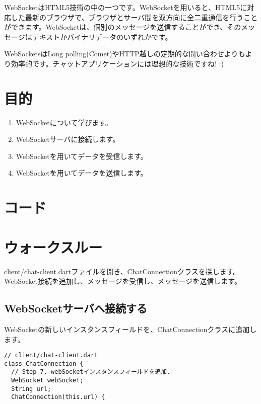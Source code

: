 
WebSocketはHTML5技術の中の一つです。WebSocketを用いると、HTML5に対応した最新のブラウザで、ブラウザとサーバ間を双方向に全二重通信を行うことができます。WebSocketは、個別のメッセージを送信することができ、そのメッセージはテキストかバイナリデータのいずれかです。

WebSocketsはLong polling(Comet)やHTTP越しの定期的な問い合わせよりもより効率的です。チャットアプリケーションには理想的な技術ですね! :)

\section{目的}

\begin{enumerate}
\item WebSocketについて学びます。
\item WebSocketサーバに接続します。
\item WebSocketを用いてデータを受信します。
\item WebSocketを用いてデータを送信します。
\end{enumerate}

\section{コード}


\section{ウォークスルー}

client/chat-client.dartファイルを開き、ChatConnectionクラスを探します。WebSocket接続を追加し、メッセージを受信し、メッセージを送信します。


\subsection{WebSocketサーバへ接続する}

WebSocketの新しいインスタンスフィールドを、ChatConnectionクラスに追加します。

\begin{verbatim}
// client/chat-client.dart
class ChatConnection {
  // Step 7. webSocketインスタンスフィールドを追加.
  WebSocket webSocket;
  String url;
  ChatConnection(this.url) {
\end{verbatim}

